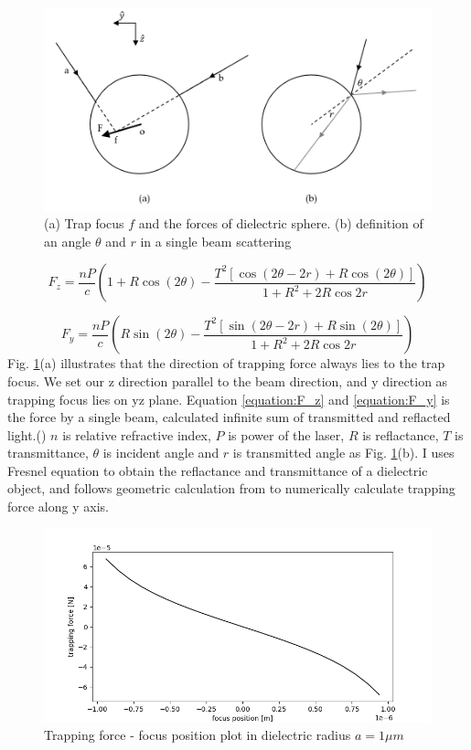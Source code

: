 \documentclass{article}
\begin{document}
\begin{figure}[h]
    \centering
    \includegraphics[width=0.8\linewidth]{../results/Optical_tweezer_illust.png}
    \caption{(a) Trap focus $f$ and the forces of dielectric sphere. (b) definition of an angle $\theta$ and $r$ in a single beam scattering}
    \label{Figure:Optical tweezer}
\end{figure}

\begin{equation}
    F_z = \frac{nP}{c} ( 1+ R \cos(2 \theta) - \frac{T^2 [\cos(2 \theta - 2r) + R \cos(2\theta)]}{1+R^2 + 2R \cos 2r} )
    \label{equation:F_z}
\end{equation}

\begin{equation}
    F_y = \frac{nP}{c} (R \sin(2 \theta) - \frac{T^2 [\sin(2 \theta - 2r) + R \sin(2\theta)]}{1+R^2 + 2R \cos 2r} )
    \label{equation:F_y}
\end{equation}
Fig. \ref{Figure:Optical tweezer}(a) illustrates that the direction of trapping force always lies to the trap focus.
We set our z direction parallel to the beam direction, and y direction as trapping focus lies on yz plane.
Equation \ref{equation:F_z} and \ref{equation:F_y} is the force by a single beam, calculated infinite sum of transmitted and reflacted light.(\cite{single_beam})
$n$ is relative refractive index, $P$ is power of the laser, $R$ is reflactance, $T$ is transmittance, $\theta$ is incident angle and $r$ is transmitted angle as Fig. \ref{Figure:Optical tweezer}(b).
I uses Fresnel equation to obtain the reflactance and transmittance of a dielectric object, and follows geometric calculation from \cite{single_beam} to numerically calculate trapping force along y axis.

\begin{figure}[t]
    \centering
    \includegraphics[width=0.8\linewidth]{../results/Optical_tweezer_intro_fig.png}
    \caption{Trapping force - focus position plot in dielectric radius $a = 1\mu m$}
    \label{Figure:Optical tweezer force}
\end{figure}
\end{document}
